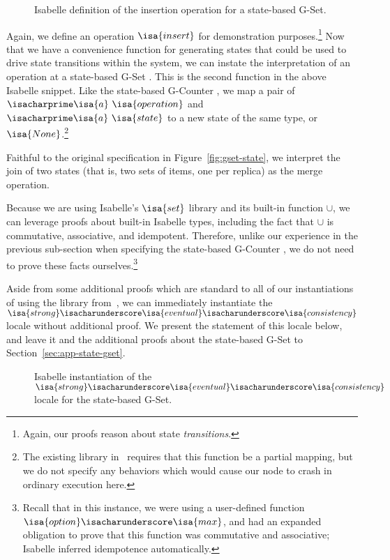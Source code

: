 \begin{figure}[H]
  
  \caption{Isabelle definition of the insertion operation for a state-based
    G-Set.}
\end{figure}

Again, we define an operation $\isa{insert}$ for demonstration
purposes.\footnote{Again, our proofs reason about state \emph{transitions}.} Now
that we have a convenience function for generating states that could be used to
drive state transitions within the system, we can instate the interpretation of
an operation at a state-based G-Set \CRDT. This is the second function in the
above Isabelle snippet. Like the state-based G-Counter \CRDT, we map a pair of
$\isacharprime\isa{a}~\isa{operation}$ and $\isacharprime\isa{a}~\isa{state}$ to
a new state of the same type, or $\isa{None}$.\footnote{The existing library
in~\citep{gomes17} requires that this function be a partial mapping, but we do
not specify any behaviors which would cause our node to crash in ordinary
execution here.}

Faithful to the original specification in Figure~\ref{fig:gset-state}, we
interpret the join of two states (that is, two sets of items, one per replica)
as the merge operation.

Because we are using Isabelle's $\isa{set}$ library and its built-in function
$\cup$, we can leverage proofs about built-in Isabelle types, including the fact
that $\cup$ is commutative, associative, and idempotent. Therefore, unlike our
experience in the previous sub-section when specifying the state-based G-Counter
\CRDT, we do not need to prove these facts ourselves.\footnote{Recall that in
this instance, we were using a user-defined function
$\isa{option}\isacharunderscore\isa{max}$, and had an expanded obligation to
prove that this function was commutative and associative; Isabelle inferred
idempotence automatically.}

Aside from some additional proofs which are standard to all of our
instantiations of \CRDTs using the library from~\citep{gomes17}, we can
immediately instantiate the
$\isa{strong}\isacharunderscore\isa{eventual}\isacharunderscore\isa{consistency}$
locale without additional proof. We present the statement of this locale below,
and leave it and the additional proofs about the state-based G-Set to
Section~\ref{sec:app-state-gset}.

\begin{figure}[H]
  
  \caption{Isabelle instantiation of the
    $\isa{strong}\isacharunderscore\isa{eventual}\isacharunderscore\isa{consistency}$
    locale for the state-based G-Set.}
\end{figure}

